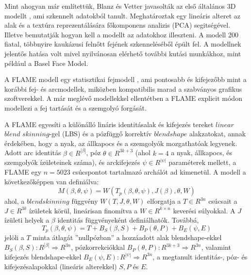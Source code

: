 \documentclass[12pt,a4]{article}
\begin{document}
    Mint ahogyan már említettük, Blanz és Vetter javasolták az első általános 3D modellt \cite{3dmm}, ami szkennelt adatokból tanult. Meghatároztak egy lineáris alteret az alak és a textúra reprezentálására főkomponens analizis (PCA) segitségével. Illetve bemutatják hogyan kell a modellt az adatokhoz illeszteni. A modell 200 fiatal, többnyire kaukázusi felnőtt fejének szkenneléséből épült fel. A modellnek jelentős hatása volt mivel nyilvánosan elérhető további kutási munkákhoz, mint például a Basel Face Model.

    A FLAME modell egy statisztikai fejmodell \cite{flame}, ami pontosabb és kifejezőbb mint a korábbi fej- és arcmodellek, miközben kompatibilis marad a szabványos grafikus szoftverekkel.
    A már meglévő modellekkel ellentétben a FLAME explicit módon modellezi a fej tartását és a szemgolyó forgását.

    A FLAME egyesíti a különálló lináris identitásalak és kifejezés tereket $linear$ $blend$ $skinning$-gel (LBS) és a pózfüggő korrektív $blendshape$ alakzatokat, annak érdekében, hogy
    a nyak, az állkapocs és a szemgolyók mozgathatóak legyenek. Adott arc identitás $\beta ∈ R^{|\beta|}$, póz $\theta \in R^{3k+3}$ (ahol $k = 4$ a nyak, állkapocs, és szemgolyók ízületeinek száma), és arckifejezés $\psi \in R^{|\psi|}$ paraméterek mellett, a FLAME egy $n = 5023 $ csúcspontot tartalmazó archálót ad kimenetül.
    A modell a következőképpen van definiálva: 
    \begin{equation*}
        M (\beta, \theta, \psi) = W (T_{p}(\beta, \theta, \psi), J(\beta), \theta, W)
    \end{equation*}
    ahol, a $blendskinning$ függvény $W (T, J, θ, W)$ elforgatja a 
    $T \in R^{3n}$ csúcsait a $J \in R^{3k}$ ízületek körül, lineárisan finomítva a $W \in R^{k\times n}$
    keverési súlyokkal. A $J$ ízületi helyek a $\beta$ identitás függvényeként definiálhatók.
    Továbbá, 
    \begin{equation*}
        T_{p}(\beta, \theta, \psi) = T + B_{S}(\beta, S) + B_{P}(\theta, P) + B_{E}(\psi, E)
    \end{equation*}
     jelöli a $T$ minta átlagát ”nullpózban” a hozzáadott alak blendshape-ekkel $B_{S} (\beta, S) : R^{|\beta|} \Rightarrow R^{3n}$, pózkorrekciókkal $B_{P}(\theta, P) : R^{3k+3} \Rightarrow R^{3n}$, valamint kifejezés blendshape-ekkel $B_{E}(\psi, E) : R^{|\psi|} \Rightarrow R^{3n}$, a megtanult identitás-, póz- és kifejezésalapokkal (lineáris alterekkel) $S, P$ és $E$. \\
\end{document}
